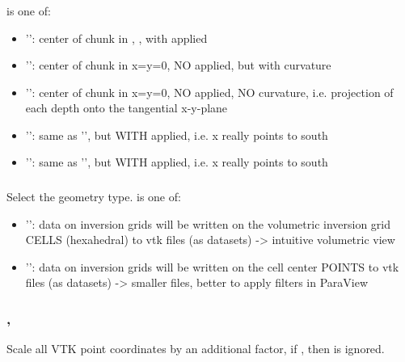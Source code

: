 \subsubsection{}
 is one of:
\begin{itemize}
\item[] '': center of chunk in , , with applied 
\item[] '': center of chunk in x=y=0, NO  applied, but with curvature
\item[] '': center of chunk in x=y=0, NO  applied, NO curvature, i.e. projection of each depth onto the tangential x-y-plane
\item[] '': same as '', but WITH  applied, i.e. x really points to south
\item[] '': same as '', but WITH  applied, i.e. x really points to south
\end{itemize}
\subsubsection{}
Select the geometry type.  is one of:
\begin{itemize}
\item[]'': data on inversion grids will be written on the volumetric inversion grid CELLS (hexahedral) to vtk files (as  datasets) -> intuitive volumetric view
\item[]'': data on inversion grids will be written on the cell center POINTS to vtk files (as  datasets) -> smaller files, better to apply filters in ParaView
\end{itemize}
\subsubsection{, }
Scale all VTK point coordinates by an additional factor,
if , then  is ignored.
%
